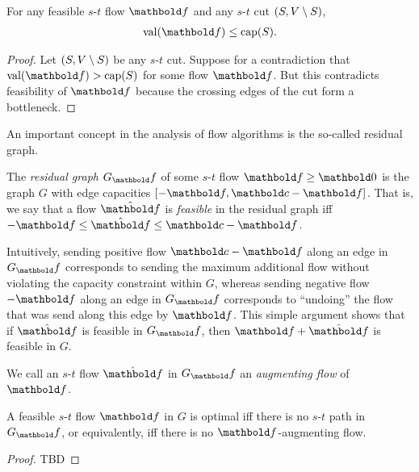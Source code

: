\begin{thm}
For any feasible $s$-$t$ flow $\vf$ and any $s$-$t$ cut $(S, V \setminus S)$, \begin{align}
    \val(\vf) \leq \capa(\sS).
\end{align}
\end{thm}
\begin{proof}
Let $(S, V \setminus S)$ be any $s$-$t$ cut. Suppose for a contradiction that $\val(\vf) > \capa(\sS)$ for some flow $\vf$. But this contradicts feasibility of $\vf$ because the crossing edges of the cut form a bottleneck.
\end{proof}

An important concept in the analysis of flow algorithms is the so-called residual graph.

\begin{defn}
The \emph{residual graph} $G_\vf$ of some $s$-$t$ flow $\vf \geq \vZero$ is the graph $G$ with edge capacities $[-\vf, \vc - \vf]$. That is, we say that a flow $\hat{\vf}$ is \emph{feasible} in the residual graph iff $-\vf \leq \hat{\vf} \leq \vc - \vf$.
\end{defn}

Intuitively, sending positive flow $\vc - \vf$ along an edge in $G_\vf$ corresponds to sending the maximum additional flow without violating the capacity constraint within $G$, whereas sending negative flow $-\vf$ along an edge in $G_\vf$ corresponds to ``undoing'' the flow that was send along this edge by $\vf$. This simple argument shows that if $\hat{\vf}$ is feasible in $G_\vf$, then $\vf + \hat{\vf}$ is feasible in $G$.

We call an $s$-$t$ flow $\hat{\vf}$ in $G_\vf$ an \emph{augmenting flow} of $\vf$.

\begin{lem}
A feasible $s$-$t$ flow $\vf$ in $G$ is optimal iff there is no $s$-$t$ path in $G_\vf$, or equivalently, iff there is no $\vf$-augmenting flow.
\end{lem}
\begin{proof}
TBD
\end{proof}

